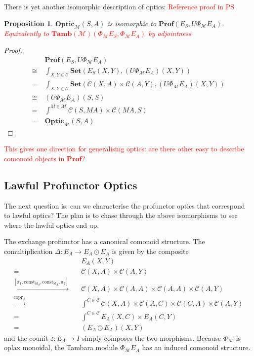 \documentclass[11pt,a4paper]{article}
\theoremstyle{plain}
\newtheorem{proposition}[theorem]{Proposition}
\theoremstyle{definition}
\newcommand{\C}{\mathscr{C}}
\newcommand{\M}{\mathscr{M}}
\newcommand{\Pastro}{\Phi}
\newcommand{\Set}{\mathbf{Set}}
\newcommand{\Prof}{\mathbf{Prof}}
\newcommand{\Optic}{\mathbf{Optic}}
\newcommand{\Tamb}{\mathbf{Tamb}}
\newcommand{\id}{\mathrm{id}}
\newcommand{\const}{\mathrm{const}}
\DeclareMathOperator{\copr}{copr}
\newcommand{\todo}[1]{\textcolor{red}{\small #1}}
\begin{document}
There is yet another isomorphic description of optics: \todo{Reference proof in PS}

\begin{proposition}
$\Optic_\M(S, A)$ is isomorphic to $\Prof(E_S, U \Phi_\M E_A)$. \todo{Equivalently to $\Tamb(\M)(\Phi_\M E_S, \Phi_\M E_A)$ by adjointness}
\end{proposition}
\begin{proof}
\begin{align*}
&\Prof(E_S, U \Phi_\M E_A) \\
\cong\;&\int_{X,Y \in \C} \Set(E_S(X,Y), (U \Phi_\M E_A)(X,Y)) \\
= \;&\int_{X,Y \in \C} \Set(\C(X,A) \times \C(A,Y), (U \Phi_\M E_A)(X,Y)) \\
\cong \;& (U \Phi_\M E_A)(S,S) \\
= \;&\int^{M \in \M} \C(S, MA) \times \C(MA, S) \\
= \;&\Optic_\M(S, A)
\end{align*}
\end{proof}

\todo{This gives one direction for generalising optics: are there other easy to describe comonoid objects in $\Prof$?}

\subsection{Lawful Profunctor Optics}

The next question is: can we characterise the profunctor optics that correspond to lawful optics? The plan is to chase through the above isomorphisms to see where the lawful optics end up.

The exchange profunctor has a canonical comonoid structure. The comultiplication $\Delta : E_A \to E_A \odot E_A$ is given by the composite
\begin{align*}
&E_A(X,Y) \\
= \quad& \C(X, A) \times \C(A, Y) \\
\xrightarrow{[\pi_1, \const_{\id_A}, \const_{\id_A}, \pi_2]} \quad& \C(X, A) \times \C(A, A) \times \C(A, A) \times \C(A, Y) \\
\xrightarrow{\copr_A} \quad& \int^{C \in \C} \C(X, A) \times \C(A, C) \times \C(C, A) \times \C(A, Y) \\
= \quad& \int^{C \in \C} E_A(X,C) \times E_A(C,Y) \\
= \quad&  (E_A \odot E_A)(X,Y)
\end{align*}
and the counit $\varepsilon : E_A \to I$ simply composes the two morphisms. Because $\Pastro_\M$ is oplax monoidal, the Tambara module $\Pastro_\M E_A$ has an induced comonoid structure.
\end{document}
